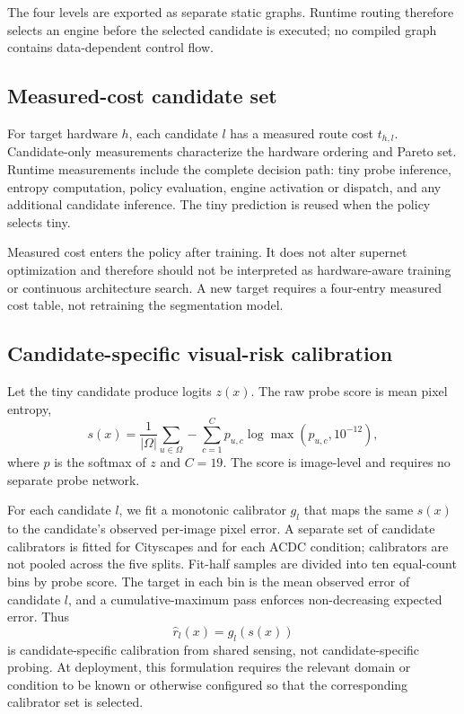 \documentclass[a4paper,review,12pt]{elsarticle}
\begin{document}
The four levels are exported as separate static graphs. Runtime routing therefore selects an engine before the selected candidate is executed; no compiled graph contains data-dependent control flow.

\subsection{Measured-cost candidate set}
\label{sec:measured-cost}

For target hardware $h$, each candidate $l$ has a measured route cost $t_{h,l}$. Candidate-only measurements characterize the hardware ordering and Pareto set. Runtime measurements include the complete decision path: tiny probe inference, entropy computation, policy evaluation, engine activation or dispatch, and any additional candidate inference. The tiny prediction is reused when the policy selects tiny.

Measured cost enters the policy after training. It does not alter supernet optimization and therefore should not be interpreted as hardware-aware training or continuous architecture search. A new target requires a four-entry measured cost table, not retraining the segmentation model.

\subsection{Candidate-specific visual-risk calibration}
\label{sec:calibration}

Let the tiny candidate produce logits $z(x)$. The raw probe score is mean pixel entropy,
\begin{equation}
s(x)=\frac{1}{|\Omega|}\sum_{u\in\Omega}-\sum_{c=1}^{C}p_{u,c}\log\max(p_{u,c},10^{-12}),
\label{eq:entropy}
\end{equation}
where $p$ is the softmax of $z$ and $C=19$. The score is image-level and requires no separate probe network.

For each candidate $l$, we fit a monotonic calibrator $g_l$ that maps the same $s(x)$ to the candidate's observed per-image pixel error. A separate set of candidate calibrators is fitted for Cityscapes and for each ACDC condition; calibrators are not pooled across the five splits. Fit-half samples are divided into ten equal-count bins by probe score. The target in each bin is the mean observed error of candidate $l$, and a cumulative-maximum pass enforces non-decreasing expected error. Thus
\begin{equation}
\widehat{r}_l(x)=g_l(s(x))
\label{eq:risk}
\end{equation}
is candidate-specific calibration from shared sensing, not candidate-specific probing. At deployment, this formulation requires the relevant domain or condition to be known or otherwise configured so that the corresponding calibrator set is selected.
\end{document}
